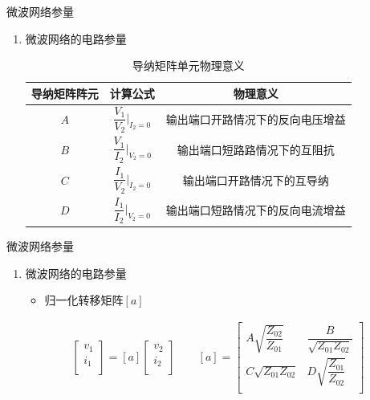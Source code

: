 \begin{frame}{微波网络参量}
    \begin{enumerate}
        \item 微波网络的电路参量
        \begin{table}
            \caption{导纳矩阵单元物理意义}
            \footnotesize
            \begin{tabular}{|c|c|c|}
                \hline
                \textbf{导纳矩阵阵元}   & \textbf{计算公式}                            & \textbf{物理意义}             \\ \hline
                $A$ & $\dfrac{V_1}{V_2}\bigg\vert_{I_2=0}$ & 输出端口开路情况下的反向电压增益   \\ \hline
                $B$ & $\dfrac{V_1}{I_2}\bigg\vert_{V_2=0}$ & 输出端口短路路情况下的互阻抗 \\ \hline
                $C$ & $\dfrac{I_1}{V_2}\bigg\vert_{I_2=0}$ & 输出端口开路情况下的互导纳 \\ \hline
                $D$ & $\dfrac{I_1}{I_2}\bigg\vert_{V_2=0}$ & 输出端口短路情况下的反向电流增益   \\ \hline
            \end{tabular}
        \end{table}
    \end{enumerate}
\end{frame}

\begin{frame}{微波网络参量}
    \begin{enumerate}
        \item 微波网络的电路参量
        \begin{itemize}
            \item 归一化转移矩阵$[a]$
        \end{itemize}
        \begin{gather*}
            \begin{bmatrix*}
                v_1 \\
                i_1 \\
            \end{bmatrix*}
            =[a]
            \begin{bmatrix*}
                v_2 \\
                i_2 \\
            \end{bmatrix*}
            \qquad
            [a]=
            \begin{bmatrix*}
                A\sqrt{\dfrac{Z_{02}}{Z_{01}}} & \dfrac{B}{\sqrt{Z_{01}Z_{02}}} \\
                C\sqrt{Z_{01}Z_{02}} & D\sqrt{\dfrac{Z_{01}}{Z_{02}}} \\
            \end{bmatrix*}
        \end{gather*}
    \end{enumerate}
\end{frame}

